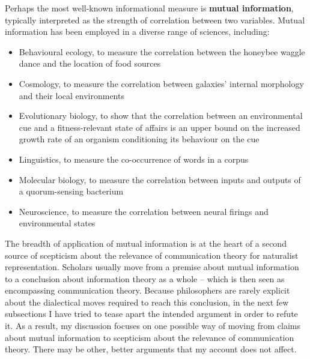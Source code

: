 

Perhaps the most well-known informational measure is \textbf{mutual information}, typically interpreted as the strength of correlation between two variables.
Mutual information has been employed in a diverse range of sciences, including:

\begin{itemize}
    \item Behavioural ecology, to measure the correlation between the honeybee waggle dance and the location of food sources \citep{haldane1954statistical}
    \item Cosmology, to measure the correlation between galaxies' internal morphology and their local environments \citep{pandey2017how}
    \item Evolutionary biology, to show that the correlation between an environmental cue and a fitness-relevant state of affairs is an upper bound on the increased growth rate of an organism conditioning its behaviour on the cue \citep{donaldson-matasci2010fitness}
    \item Linguistics, to measure the co-occurrence of words in a corpus \citep[$\S$4]{hunston2002corpora}
    \item Molecular biology, to measure the correlation between inputs and outputs of a quorum-sensing bacterium \citep{mehta2009information}
    \item Neuroscience, to measure the correlation between neural firings and environmental states \citep[][and references therein]{rathkopf2017neural}
\end{itemize}


\noindent The breadth of application of mutual information is at the heart of a second source of scepticism about the relevance of communication theory for naturalist representation.
Scholars usually move from a premise about mutual information to a conclusion about information theory as a whole -- which is then seen as encompassing communication theory.
Because philosophers are rarely explicit about the dialectical moves required to reach this conclusion, in the next few subsections I have tried to tease apart the intended argument in order to refute it.
As a result, my discussion focuses on one possible way of moving from claims about mutual information to scepticism about the relevance of communication theory.
There may be other, better arguments that my account does not affect.

